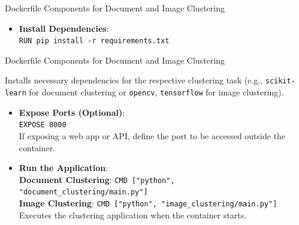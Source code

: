\documentclass[notes]{beamer}
\begin{document}
{\begin{frame}{Dockerfile Components for Document and Image Clustering}
\begin{itemize}
        \item \textbf{Install Dependencies}: \\
        \texttt{RUN pip install -r requirements.txt} \\
       
   \end{itemize}
\end{frame}
        
        \begin{frame}{Dockerfile Components for Document and Image Clustering}
    
        Installs necessary dependencies for the respective clustering task (e.g., \texttt{scikit-learn} for document clustering or \texttt{opencv}, \texttt{tensorflow} for image clustering).
        \begin{itemize}
        \item \textbf{Expose Ports (Optional)}: \\
        \texttt{EXPOSE 8000} \\
        If exposing a web app or API, define the port to be accessed outside the container.
        
        \item \textbf{Run the Application}: \\
        \textbf{Document Clustering}: \texttt{CMD ["python", "document\_clustering/main.py"]} \\
        \textbf{Image Clustering}: \texttt{CMD ["python", "image\_clustering/main.py"]} \\
        Executes the clustering application when the container starts.
    \end{itemize}
\end{frame}


}
\end{document}
